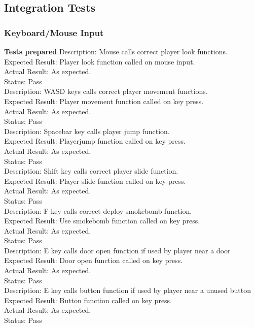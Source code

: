 \documentclass[11pt,a4paper]{article}
\begin{document}
\subsection{Integration Tests}
\subsubsection{Keyboard/Mouse Input}
\textbf{Tests prepared}
Description: Mouse calls correct player look functions.\\
Expected Result: Player look function called on mouse input.\\
Actual Result: As expected.\\
Status: Pass
\smallskip\\
Description: WASD keys calls correct player movement functions.\\
Expected Result: Player movement function called on key press.\\
Actual Result: As expected.\\
Status: Pass
\smallskip\\
Description: Spacebar key calls player jump function.\\
Expected Result: Playerjump function called on key press.\\
Actual Result: As expected.\\
Status: Pass
\smallskip\\
Description: Shift key calls correct player slide function.\\
Expected Result: Player slide function called on key press.\\
Actual Result: As expected.\\
Status: Pass
\smallskip\\
Description: F key calls correct deploy smokebomb function.\\
Expected Result: Use smokebomb function called on key press.\\
Actual Result: As expected.\\
Status: Pass
\smallskip\\
Description: E key calls door open function if used by player near a door\\
Expected Result: Door open function called on key press.\\
Actual Result: As expected.\\
Status: Pass
\smallskip\\
Description: E key calls button function if used by player near a unused button\\
Expected Result: Button function called on key press.\\
Actual Result: As expected.\\
Status: Pass
\end{document}
